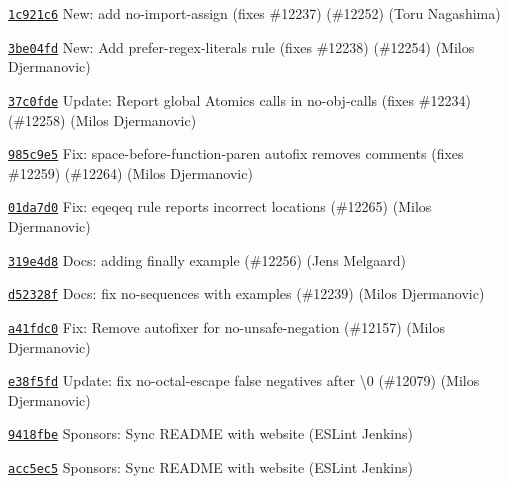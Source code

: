 \begin{DoxyItemize}
\item \href{https://github.com/eslint/eslint/commit/1c921c6dfd7ddfb0308c8103e53d32c1241475f0}{\texttt{ {\ttfamily 1c921c6}}} New\+: add no-\/import-\/assign (fixes \#12237) (\#12252) (Toru Nagashima)
\item \href{https://github.com/eslint/eslint/commit/3be04fd6a4e7b3f5a5ecb845a29cf29b71fe2dfb}{\texttt{ {\ttfamily 3be04fd}}} New\+: Add prefer-\/regex-\/literals rule (fixes \#12238) (\#12254) (Milos Djermanovic)
\item \href{https://github.com/eslint/eslint/commit/37c0fdeb87b92a0b779b125adf45535b79b65757}{\texttt{ {\ttfamily 37c0fde}}} Update\+: Report global Atomics calls in no-\/obj-\/calls (fixes \#12234) (\#12258) (Milos Djermanovic)
\item \href{https://github.com/eslint/eslint/commit/985c9e5eba351965a8a1491a41dbdcc78154b8f4}{\texttt{ {\ttfamily 985c9e5}}} Fix\+: space-\/before-\/function-\/paren autofix removes comments (fixes \#12259) (\#12264) (Milos Djermanovic)
\item \href{https://github.com/eslint/eslint/commit/01da7d04c4e5a7376cf241ec02db7971726a1bf9}{\texttt{ {\ttfamily 01da7d0}}} Fix\+: eqeqeq rule reports incorrect locations (\#12265) (Milos Djermanovic)
\item \href{https://github.com/eslint/eslint/commit/319e4d8386ea846928f0f906c251b46043a53491}{\texttt{ {\ttfamily 319e4d8}}} Docs\+: adding finally example (\#12256) (Jens Melgaard)
\item \href{https://github.com/eslint/eslint/commit/d52328f012f3704c7d1ce39427e63f80531c7979}{\texttt{ {\ttfamily d52328f}}} Docs\+: fix no-\/sequences {\ttfamily with} examples (\#12239) (Milos Djermanovic)
\item \href{https://github.com/eslint/eslint/commit/a41fdc07404a7675d14183fab245fb8f49dcb858}{\texttt{ {\ttfamily a41fdc0}}} Fix\+: Remove autofixer for no-\/unsafe-\/negation (\#12157) (Milos Djermanovic)
\item \href{https://github.com/eslint/eslint/commit/e38f5fdfc786363a3eae642f1a69a8725600aa61}{\texttt{ {\ttfamily e38f5fd}}} Update\+: fix no-\/octal-\/escape false negatives after \textbackslash{}0 (\#12079) (Milos Djermanovic)
\item \href{https://github.com/eslint/eslint/commit/9418fbe0eb31cace3debe27b620709628df2fad7}{\texttt{ {\ttfamily 9418fbe}}} Sponsors\+: Sync R\+E\+A\+D\+ME with website (E\+S\+Lint Jenkins)
\item \href{https://github.com/eslint/eslint/commit/acc5ec5082aed466a29899f651e6767b39155aec}{\texttt{ {\ttfamily acc5ec5}}} Sponsors\+: Sync R\+E\+A\+D\+ME with website (E\+S\+Lint Jenkins)

\end{DoxyItemize}
